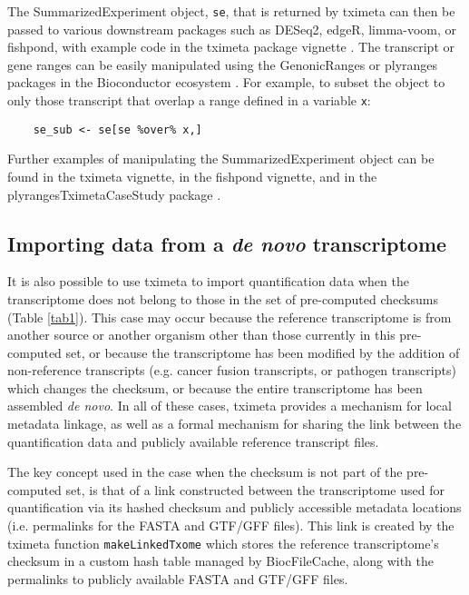 \documentclass[12pt]{article} \usepackage[utf8]{inputenc}
\begin{document}
The SummarizedExperiment object, \texttt{se}, that is returned by
tximeta can then be passed to various downstream packages such as
DESeq2, edgeR, limma-voom, or fishpond, with example code in the
tximeta package vignette \citep{deseq2,edger,limma,voom,swish}. The
transcript or gene ranges can be easily manipulated using the
GenonicRanges or plyranges packages in the Bioconductor ecosystem
\citep{granges,Lee2019}. For example, to subset the object to only
those transcript that overlap a range defined in a variable
\texttt{x}:

\begin{verbatim}
    se_sub <- se[se %over% x,]
\end{verbatim}

Further examples of manipulating the SummarizedExperiment object can
be found in the tximeta vignette, in the fishpond vignette, and in the
plyrangesTximetaCaseStudy package \citep{casestudy}.

\subsection*{Importing data from a \textit{de novo} transcriptome}

It is also possible to use tximeta to import quantification data when
the transcriptome does not belong to those in the set of pre-computed
checksums (Table \ref{tab1}). This case may occur because the
reference transcriptome is from another source or another organism
other than those currently in this pre-computed set, or because the
transcriptome has been modified by the addition of non-reference
transcripts (e.g. cancer fusion transcripts, or pathogen transcripts)
which changes the checksum, or because the entire transcriptome has
been assembled \textit{de novo}. In all of these cases, tximeta
provides a mechanism for local metadata linkage, as well as a formal
mechanism for sharing the link between the quantification data and
publicly available reference transcript files.

The key concept used in the case when the checksum is not part of the
pre-computed set, is that of a link constructed between the
transcriptome used for quantification via its hashed checksum and
publicly accessible metadata locations (i.e. permalinks for the FASTA
and GTF/GFF files). This link is created by the tximeta function
\texttt{makeLinkedTxome} which stores the reference transcriptome's
checksum in a custom hash table managed by BiocFileCache, along with
the permalinks to publicly available FASTA and GTF/GFF files.
\end{document}
